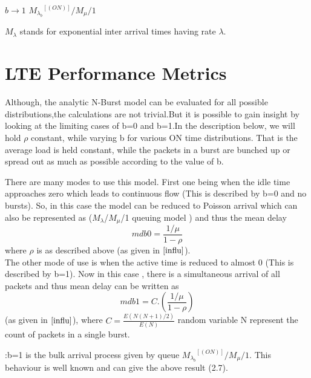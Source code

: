 \begin{center}
$b\rightarrow 1$  ${M_{\lambda_{b}}}^{[(ON)]}/M_{\mu}/1$ 
\end{center}

\begin{remark}
$M_{\lambda}$ stands for exponential inter arrival times having rate $\lambda$.
\end{remark}

\section{LTE Performance Metrics}

\begin{remark}
Although, the analytic N-Burst model can be evaluated for all possible distributions,the calculations are not trivial.But it is possible to gain insight by looking at the limiting cases of b=0 and b=1.In the description below, we will hold $\rho$ constant, while varying b for various ON time distributions. That is the average load is held constant, while the packets in a burst are bunched up or spread out as much as possible according to the value of b.\\
\end{remark}

There are many modes to use this model. First one being when the idle time approaches zero which leads to continuous flow (This is described by b=0 and no bursts). So, in this case the model can be reduced to Poisson arrival which can also be represented as ($M_{\lambda}$/$M_{\mu}$/1 queuing model ) and thus the mean delay
\begin{equation}
    mdb0 = \frac{1/{\mu}}{1-\rho}
\end{equation}
 where $\rho$ is as described above (as given in $\cite{influ}$).\\
The other mode of use is when the active time is reduced to almost 0 (This is described by b=1). Now in this case , there is a simultaneous arrival of all packets and thus mean delay can be written as
\begin{equation}
 mdb1 = C.(\frac{1/{\mu}}{1-\rho})   
\end{equation}
(as given in $\cite{influ}$), where $ C = \frac{E(N(N+1)/2)}{E(N)}$ random variable N represent the count of packets in a single burst.\\

\begin{remark}
:b=1 is the bulk arrival process given by queue ${M_{\lambda_{b}}}^{[(ON)]}/M_{\mu}/1$. This behaviour is well known and can give the above result (2.7).
\end{remark}


